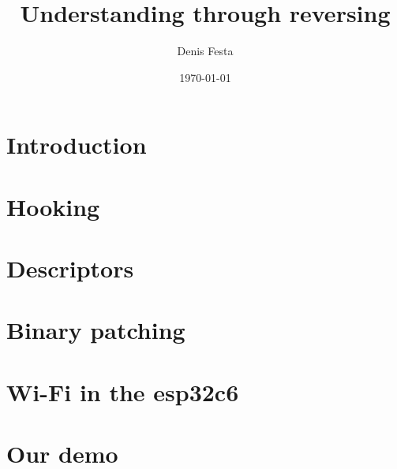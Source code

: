 \documentclass[10pt,twocolumn,a4paper]{article}
\begin{document}
\title{Understanding through reversing}
\author{Denis Festa}
\date{\today}

\maketitle

\tableofcontents

\section{Introduction}
%
%
%
%
%
%
\section{Hooking}
\label{sec:hooking}


\section{Descriptors}



\section{Binary patching}



\section{Wi-Fi in the esp32c6}
\label{sec:wifiinesp32c6}


\section{Our demo}
\label{sec:demo}
\end{document}
